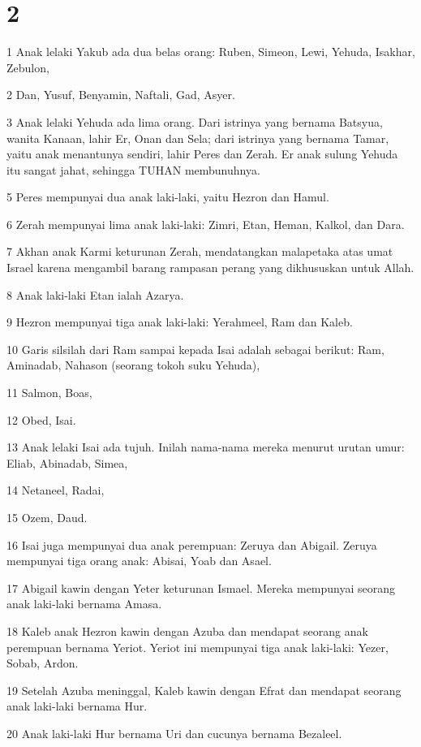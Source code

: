 \chapter{2}

\par 1 Anak lelaki Yakub ada dua belas orang: Ruben, Simeon, Lewi, Yehuda, Isakhar, Zebulon,
\par 2 Dan, Yusuf, Benyamin, Naftali, Gad, Asyer.
\par 3 Anak lelaki Yehuda ada lima orang. Dari istrinya yang bernama Batsyua, wanita Kanaan, lahir Er, Onan dan Sela; dari istrinya yang bernama Tamar, yaitu anak menantunya sendiri, lahir Peres dan Zerah. Er anak sulung Yehuda itu sangat jahat, sehingga TUHAN membunuhnya.
\par 5 Peres mempunyai dua anak laki-laki, yaitu Hezron dan Hamul.
\par 6 Zerah mempunyai lima anak laki-laki: Zimri, Etan, Heman, Kalkol, dan Dara.
\par 7 Akhan anak Karmi keturunan Zerah, mendatangkan malapetaka atas umat Israel karena mengambil barang rampasan perang yang dikhususkan untuk Allah.
\par 8 Anak laki-laki Etan ialah Azarya.
\par 9 Hezron mempunyai tiga anak laki-laki: Yerahmeel, Ram dan Kaleb.
\par 10 Garis silsilah dari Ram sampai kepada Isai adalah sebagai berikut: Ram, Aminadab, Nahason (seorang tokoh suku Yehuda),
\par 11 Salmon, Boas,
\par 12 Obed, Isai.
\par 13 Anak lelaki Isai ada tujuh. Inilah nama-nama mereka menurut urutan umur: Eliab, Abinadab, Simea,
\par 14 Netaneel, Radai,
\par 15 Ozem, Daud.
\par 16 Isai juga mempunyai dua anak perempuan: Zeruya dan Abigail. Zeruya mempunyai tiga orang anak: Abisai, Yoab dan Asael.
\par 17 Abigail kawin dengan Yeter keturunan Ismael. Mereka mempunyai seorang anak laki-laki bernama Amasa.
\par 18 Kaleb anak Hezron kawin dengan Azuba dan mendapat seorang anak perempuan bernama Yeriot. Yeriot ini mempunyai tiga anak laki-laki: Yezer, Sobab, Ardon.
\par 19 Setelah Azuba meninggal, Kaleb kawin dengan Efrat dan mendapat seorang anak laki-laki bernama Hur.
\par 20 Anak laki-laki Hur bernama Uri dan cucunya bernama Bezaleel.
